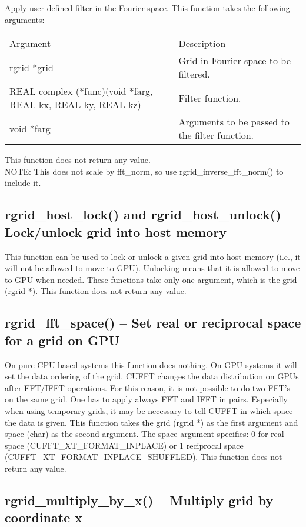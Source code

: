 \documentclass[12pt,letterpaper]{report}
\begin{document}
Apply user defined filter in the Fourier space. This function takes the following arguments:
\begin{longtable}{p{} p{}}
Argument & Description\\
\cline{1-2}
rgrid *grid & Grid in Fourier space to be filtered.\\
REAL complex (*func)(void *farg, REAL kx, REAL ky, REAL kz) & Filter function.\\
void *farg & Arguments to be passed to the filter function.\\
\end{longtable}
\noindent
This function does not return any value.\\
NOTE: This does not scale by fft\_norm, so use rgrid\_inverse\_fft\_norm() to include it.

\subsection{rgrid\_host\_lock() and rgrid\_host\_unlock() -- Lock/unlock grid into host memory}

This function can be used to lock or unlock a given grid into host memory (i.e., it will not be allowed to move to GPU). Unlocking means that it is allowed to move to GPU when needed. These functions take only one argument, which is the grid (rgrid *). This function does not return any value.

\subsection{rgrid\_fft\_space() -- Set real or reciprocal space for a grid on GPU}

On pure CPU based systems this function does nothing. On GPU systems it will set the data ordering of the grid. CUFFT changes the data distribution on GPUs after FFT/IFFT operations. For this reason, it is not possible to do two FFT's on the same grid. One has to apply always FFT and IFFT in pairs. Especially when using temporary grids, it may be necessary to tell CUFFT in which space the data is given. This function takes the grid (rgrid *) as the first argument and space (char) as the second argument. The space argument specifies: 0 for real space (CUFFT\_XT\_FORMAT\_INPLACE) or 1 reciprocal space (CUFFT\_XT\_FORMAT\_INPLACE\_SHUFFLED). This function does not return any value.

\subsection{rgrid\_multiply\_by\_x() -- Multiply grid by coordinate x}
\end{document}
